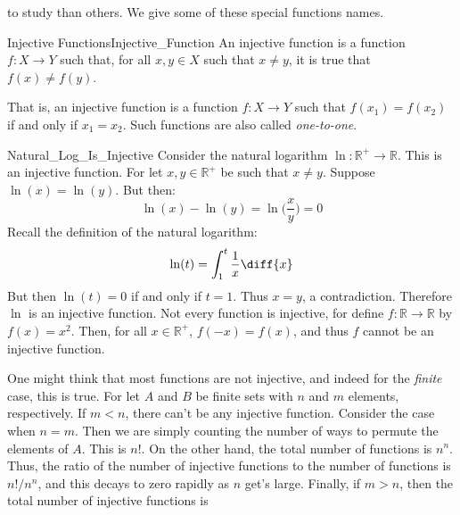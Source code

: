         to study than others. We give some of these special functions names.
        \begin{ldefinition}{Injective Functions}{Injective_Function}
            An \gls{injective function} is a function
            $f:X\rightarrow{Y}$ such that, for all
            $x,y\in{X}$ such that $x\ne{y}$, it is true that
            $f(x)\ne{f}(y)$.
        \end{ldefinition}
        That is, an injective function is a function
        $f:X\rightarrow{Y}$ such that $f(x_{1})=f(x_{2})$
        if and only if $x_{1}=x_{2}$. Such functions are also
        called \textit{one-to-one}.
        \begin{lexample}{}{Natural_Log_Is_Injective}
            Consider the natural logarithm
            $\ln:\mathbb{R}^{+}\rightarrow\mathbb{R}$. This is an injective
            function. For let $x,y\in\mathbb{R}^{+}$ be such that
            $x\ne{y}$. Suppose $\ln(x)=\ln(y)$. But then:
            \begin{equation}
                \ln(x)-\ln(y)=\ln\Big(\frac{x}{y}\Big)=0
            \end{equation}
            Recall the definition of the natural logarithm:
            \begin{equation}
                \ln(t)=\int_{1}^{t}\frac{1}{x}\diff{x}
            \end{equation}
            But then $\ln(t)=0$ if and only if $t=1$. Thus $x=y$, a
            contradiction. Therefore $\ln$ is an injective function. Not
            every function is injective, for define
            $f:\mathbb{R}\rightarrow\mathbb{R}$ by $f(x)=x^{2}$. Then, for
            all $x\in\mathbb{R}^{+}$, $f(\minus{x})=f(x)$, and thus $f$
            cannot be an injective function.
        \end{lexample}
        One might think that most functions are not injective,
        and indeed for the \textit{finite} case, this is true.
        For let $A$ and $B$ be finite sets with $n$ and $m$
        elements, respectively. If $m<n$, there can't be
        any injective function. Consider the case when $n=m$.
        Then we are simply counting the number of ways to
        permute the elements of $A$. This is $n!$. On the
        other hand, the total number of functions is
        $n^{n}$. Thus, the ratio of the number of injective
        functions to the number of functions is
        $n!/n^{n}$, and this decays to zero rapidly as
        $n$ get's large. Finally, if $m>n$, then the total
        number of injective functions is
